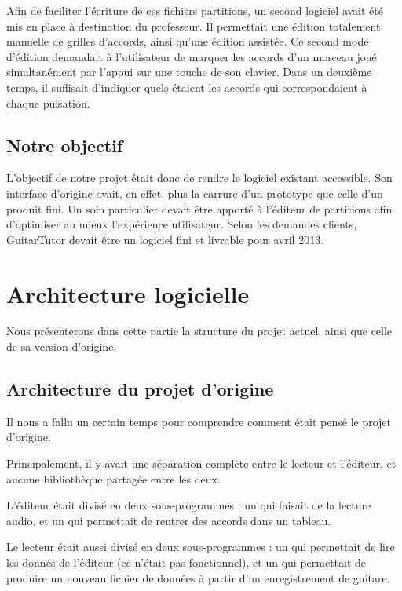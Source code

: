 \documentclass[a4paper,11pt]{article}
\begin{document}
Afin de faciliter l'écriture de ces fichiers partitions, un second logiciel avait été mis en place à destination du professeur. Il permettait une édition totalement manuelle de grilles d'accords, ainsi qu'une édition assistée. Ce second mode d'édition demandait à l'utilisateur de marquer les accords d'un morceau joué simultanément par l'appui sur une touche de son clavier. Dans un deuxième temps, il suffisait d'indiquer quels étaient les accords qui correspondaient à chaque pulsation.

\subsection*{Notre objectif}

L'objectif de notre projet était donc de rendre le logiciel existant accessible. Son interface d'origine avait, en effet, plus la carrure d'un prototype que celle d'un produit fini. Un soin particulier devait être apporté à l'éditeur de partitions afin d'optimiser au mieux l'expérience utilisateur. Selon les demandes clients, GuitarTutor devait être un logiciel fini et livrable pour avril 2013.

\clearpage

\tableofcontents

\clearpage

\section{Architecture logicielle}

Nous présenterons dans cette partie la structure du projet actuel, ainsi que celle de sa version d'origine.

\subsection{Architecture du projet d'origine}

Il nous a fallu un certain temps pour comprendre comment était pensé le projet d'origine.

Principalement, il y avait une séparation complète entre le lecteur et l'éditeur, et aucune bibliothèque partagée entre les deux.

L'éditeur était divisé en deux sous-programmes : un qui faisait de la lecture audio, et un qui permettait de rentrer des accords dans un
tableau.

Le lecteur était aussi divisé en deux sous-programmes : un qui permettait de lire les donnés de l'éditeur (ce n'était pas fonctionnel),
et un qui permettait de produire un nouveau fichier de données à partir d'un enregistrement de guitare.
\end{document}
